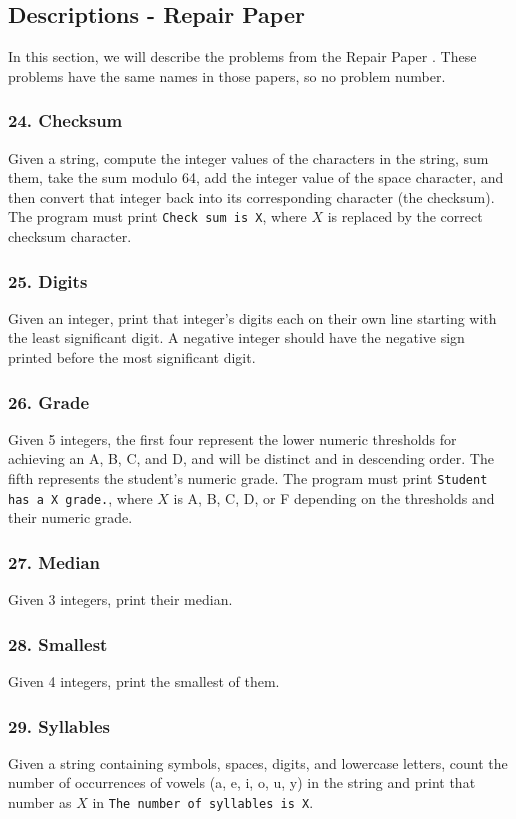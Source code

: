\documentclass{sig-alternate}
\begin{document}
\subsection{Descriptions - Repair Paper}

In this section, we will describe the problems from the Repair Paper \cite{ManyBugsAndIntroClass, Brun13TRgptest}. These problems have the same names in those papers, so no problem number.

\subsubsection*{24. Checksum}
Given a string, compute the integer values of the characters in the string, sum them, take the sum modulo 64, add the integer value of the space character, and then convert that integer back into its corresponding character (the checksum). The program must print \texttt{Check sum is X}, where $X$ is replaced by the correct checksum character.

\subsubsection*{25. Digits}
Given an integer, print that integer's digits each on their own line starting with the least significant digit. A negative integer should have the negative sign printed before the most significant digit.

\subsubsection*{26. Grade}
Given 5 integers, the first four represent the lower numeric thresholds for achieving an A, B, C, and D, and will be distinct and in descending order. The fifth represents the student's numeric grade. The program must print \texttt{Student has a X grade.}, where $X$ is A, B, C, D, or F depending on the thresholds and their numeric grade.

\subsubsection*{27. Median}
Given 3 integers, print their median.

\subsubsection*{28. Smallest}
Given 4 integers, print the smallest of them.

\subsubsection*{29. Syllables}
Given a string containing symbols, spaces, digits, and lowercase letters, count the number of occurrences of vowels (a, e, i, o, u, y) in the string and print that number as $X$ in \texttt{The number of syllables is X}.
\end{document}
